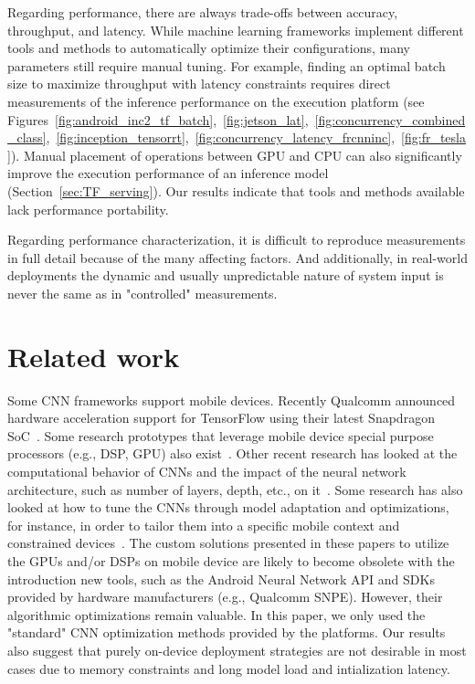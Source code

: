 \documentclass[sigconf]{acmart}
\begin{document}
Regarding performance, there are always trade-offs between accuracy, throughput, and latency. While machine learning frameworks implement different tools and methods to automatically optimize their configurations, many parameters still require manual tuning. For example, finding an optimal batch size to maximize throughput with latency constraints requires direct measurements of the inference performance on the execution platform (see Figures~\ref{fig:android_inc2_tf_batch},~\ref{fig:jetson_lat},~\ref{fig:concurrency_combined_class},~\ref{fig:inception_tensorrt},~\ref{fig:concurrency_latency_frcnninc},~\ref{fig:fr_tesla}). Manual placement of operations between GPU and CPU can also significantly improve the execution performance of an inference model (Section~\ref{sec:TF_serving}). Our results indicate that tools and methods available lack performance portability.

Regarding performance characterization, it is difficult to reproduce measurements in full detail because of the many affecting factors. And additionally, in real-world deployments the dynamic and usually unpredictable nature of system input is never the same as in "controlled" measurements.



\section{Related work}\label{sec:relatedwork}

Some CNN frameworks support mobile devices. Recently Qualcomm announced hardware acceleration support for TensorFlow using their latest Snapdragon SoC~\cite{qualcomm}. Some research prototypes that leverage mobile device special purpose processors (e.g., DSP, GPU) also exist~\cite{lane15ubicomp,lane16deepx,lane16mobicase,LatifiOskouei16mm,huynh2017deepmon}.
Other recent research has looked at the computational behavior of CNNs and the impact of the neural network architecture, such as number of layers, depth, etc., on it~\cite{qi17paleo,dong17dnnmark,howard17mobilenets}. Some research has also looked at how to tune the CNNs through model adaptation and optimizations, for instance, in order to tailor them into a specific mobile context and constrained devices~\cite{li16deepcham,han16mobisys,bhattacharya16sensys,huynh2017deepmon}. The custom solutions presented in these papers to utilize  the GPUs and/or DSPs on mobile device are likely to become obsolete with the introduction new tools, such as the Android Neural Network API and SDKs provided by hardware manufacturers (e.g., Qualcomm SNPE). However, their algorithmic optimizations remain valuable. In this paper, we only used the "standard" CNN optimization methods provided by the platforms. Our results also suggest that purely on-device deployment strategies are not desirable in most cases due to memory constraints and long model load and intialization latency.
\end{document}
